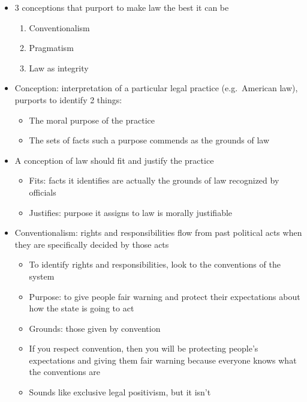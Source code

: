\begin{itemize}
\tightlist
\item
  3 conceptions that purport to make law the best it can be

  \begin{enumerate}
  \def\labelenumi{\arabic{enumi}.}
  \tightlist
  \item
    Conventionalism
  \item
    Pragmatism
  \item
    Law as integrity
  \end{enumerate}
\item
  Conception: interpretation of a particular legal practice
  (e.g.~American law), purports to identify 2 things:

  \begin{itemize}
  \tightlist
  \item
    The moral purpose of the practice
  \item
    The sets of facts such a purpose commends as the grounds of law
  \end{itemize}
\item
  A conception of law should fit and justify the practice

  \begin{itemize}
  \tightlist
  \item
    Fits: facts it identifies are actually the grounds of law recognized
    by officials
  \item
    Justifies: purpose it assigns to law is morally justifiable
  \end{itemize}
\item
  Conventionalism: rights and responsibilities flow from past political
  acts when they are specifically decided by those acts

  \begin{itemize}
  \tightlist
  \item
    To identify rights and responsibilities, look to the conventions of
    the system
  \item
    Purpose: to give people fair warning and protect their expectations
    about how the state is going to act
  \item
    Grounds: those given by convention
  \item
    If you respect convention, then you will be protecting people's
    expectations and giving them fair warning because everyone knows
    what the conventions are
  \item
    Sounds like exclusive legal positivism, but it isn't


\end{itemize}
\end{itemize}
